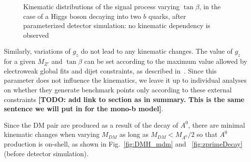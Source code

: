 \begin{figure}[h!]
\centering
{}
\hfill
{}
\caption{Kinematic distributions of the signal process varying $\tan{\beta}$, in the case of a Higgs boson decaying into two $b$ quarks,
	after parameterized detector simulation: no kinematic dependency is observed}
\label{fig:DMH_tanbeta}
\end{figure}

Similarly, variations of $g_z$ do not lead to any kinematic changes. 
The value of $g_z$ for a given $M_{Z'}$ and $\tan \beta$ can be set according to the maximum value allowed by electroweak global 
fits and dijet constraints, as described in~\cite{Berlin:2014cfa}. Since this parameter does not influence the kinematics, 
we leave it up to individual analyses on whether they generate benchmark points only according to these external constraints
\textbf{[TODO: add link to section as in summary. This is the same sentence we will put in for the mono-b model]}.   

Since the DM pair are produced as a result of the decay of $A^0$, there are minimal kinematic changes when varying $M_{DM}$ 
as long as $M_{DM}<M_{A^0}/2$ so that $A^0$ production is on-shell, as shown in Fig.~\ref{fig:DMH_mdm} and~
\ref{fig:zprimeDecay} (before detector simulation). 

